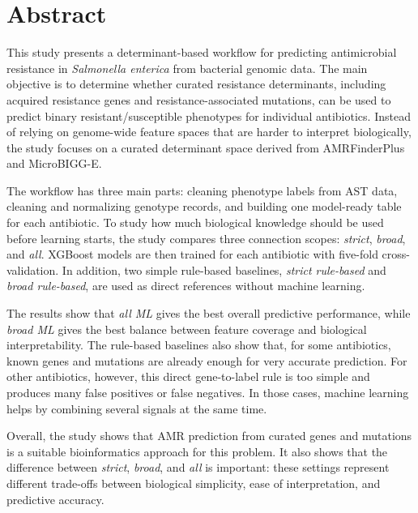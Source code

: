 \chapter*{Abstract}

This study presents a determinant-based workflow for predicting antimicrobial resistance in \textit{Salmonella enterica} from bacterial genomic data. The main objective is to determine whether curated resistance determinants, including acquired resistance genes and resistance-associated mutations, can be used to predict binary resistant/susceptible phenotypes for individual antibiotics. Instead of relying on genome-wide feature spaces that are harder to interpret biologically, the study focuses on a curated determinant space derived from AMRFinderPlus and MicroBIGG-E.

The workflow has three main parts: cleaning phenotype labels from AST data, cleaning and normalizing genotype records, and building one model-ready table for each antibiotic. To study how much biological knowledge should be used before learning starts, the study compares three connection scopes: \textit{strict}, \textit{broad}, and \textit{all}. XGBoost models are then trained for each antibiotic with five-fold cross-validation. In addition, two simple rule-based baselines, \textit{strict rule-based} and \textit{broad rule-based}, are used as direct references without machine learning.

The results show that \textit{all ML} gives the best overall predictive performance, while \textit{broad ML} gives the best balance between feature coverage and biological interpretability. The rule-based baselines also show that, for some antibiotics, known genes and mutations are already enough for very accurate prediction. For other antibiotics, however, this direct gene-to-label rule is too simple and produces many false positives or false negatives. In those cases, machine learning helps by combining several signals at the same time.

Overall, the study shows that AMR prediction from curated genes and mutations is a suitable bioinformatics approach for this problem. It also shows that the difference between \textit{strict}, \textit{broad}, and \textit{all} is important: these settings represent different trade-offs between biological simplicity, ease of interpretation, and predictive accuracy.
